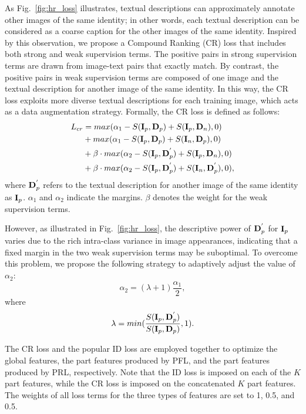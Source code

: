 \documentclass[journal]{IEEEtran}
\begin{document}
As Fig.~\ref{fig:hr_loss} illustrates, textual descriptions can approximately annotate other images of the same identity; in other words, each textual description can be considered as a coarse caption for the other images of the same identity. Inspired by this observation, we propose a Compound Ranking (CR) loss that includes both strong and weak supervision terms. The positive pairs in strong supervision terms are drawn from image-text pairs that exactly match. By contrast, the positive pairs in weak supervision terms are composed of one image and the textual description for another image of the same identity. In this way, the CR loss exploits more diverse textual descriptions for each training image, which acts as a data augmentation strategy. Formally, the CR loss is defined as follows:
\begin{equation}
\begin{aligned}
{L}_{cr} &= max({\alpha}_1-S({\bf{I}}_{p}, {\bf{D}}_{p})+S({\bf{I}}_{p},{\bf{D}}_{n}), 0)\\
&+max({\alpha}_1- S({\bf{I}}_p, {\bf{D}}_p)+S({\bf{I}}_n,{\bf{D}}_{p}), 0)\\
&+\beta\cdot max({\alpha}_2-S({\bf{I}}_p,{\bf{D}}^{'}_p)+ S({\bf{I}}_p,{\bf{D}}_n), 0)\\
&+\beta\cdot max({\alpha}_2-S({\bf{I}}_p,{\bf{D}}^{'}_p)+ S({\bf{I}}_n,{\bf{D}}^{'}_{p}), 0),
\end{aligned}
\end{equation}
where ${\bf{D}}^{'}_p$ refers to the textual description for another image of the same identity as ${\bf{I}}_p$. ${\alpha}_1$ and ${\alpha}_2$ indicate the margins. $\beta$ denotes the weight for the weak supervision terms.

However, as illustrated in Fig.~\ref{fig:hr_loss}, the descriptive power of ${\bf{D}}^{'}_p$ for ${\bf{I}}_p$ varies due to the rich intra-class variance in image appearances, indicating that a fixed margin in the two weak supervision terms may be suboptimal. To overcome this problem, we propose the following strategy to adaptively adjust the value of ${\alpha}_2$:
\begin{equation}
{\alpha}_{2} = (\lambda + 1)  \frac{{\alpha}_{1}}{2},
\end{equation}
where
\begin{equation}
\lambda = min(\frac{S({\bf{I}}_p, {\bf{D}}^{'}_p)}{S({\bf{I}}_p,{\bf{D}}_p)}, 1).
\end{equation}

The CR loss and the popular ID loss \cite{zheng2020dual} are employed together to optimize the global features, the part features produced by PFL, and the part features produced by PRL, respectively. Note that the ID loss is imposed on each of the $K$ part features, while the CR loss is imposed on the concatenated $K$ part features. The weights of all loss terms for the three types of features are set to 1, 0.5, and 0.5.
\end{document}
